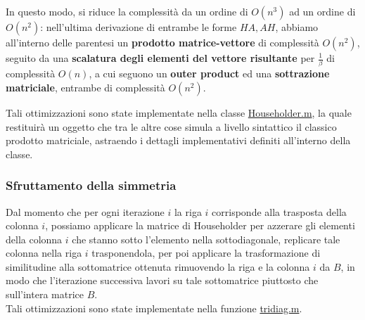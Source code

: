 \noindent	
{}
\hfill
{}

In questo modo, si riduce la complessità da un ordine di $O(n^3)$ ad un ordine 
di $O(n^2)$: nell'ultima derivazione di entrambe le forme $HA, AH$, abbiamo 
all'interno delle parentesi un \textbf{prodotto matrice-vettore} di complessità 
$O(n^2)$, seguito da una \textbf{scalatura degli elementi del vettore 
risultante} per $\frac{1}{\beta}$ di complessità $O(n)$, a cui seguono un 
\textbf{outer product} ed una \textbf{sottrazione matriciale}, entrambe di 
complessità $O(n^2)$.

Tali ottimizzazioni sono state implementate nella classe 
\href{https://github.com/Yagotzirck/svd_benchmark/blob/main/src/Householder.m}{Householder.m}, 
la quale restituirà un oggetto che tra le altre cose simula a livello sintattico 
il classico prodotto matriciale, astraendo i dettagli implementativi definiti 
all'interno della classe.

\subsubsection{Sfruttamento della simmetria}
Dal momento che per ogni iterazione $i$ la riga $i$ corrisponde alla trasposta 
della colonna $i$, possiamo applicare la matrice di Householder per azzerare gli 
elementi della colonna $i$ che stanno sotto l'elemento nella sottodiagonale, 
replicare tale colonna nella riga $i$ trasponendola, per poi applicare la 
trasformazione di similitudine alla sottomatrice ottenuta rimuovendo la riga e 
la colonna $i$ da $B$, in modo che l'iterazione successiva lavori su tale 
sottomatrice piuttosto che sull'intera matrice $B$. \\

Tali ottimizzazioni sono state implementate nella funzione 
\href{https://github.com/Yagotzirck/svd_benchmark/blob/main/src/tridiag.m}{tridiag.m}.

